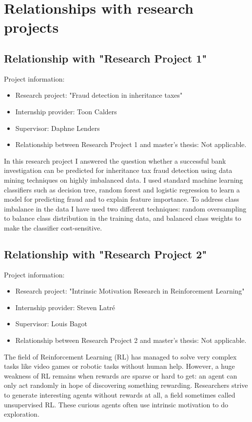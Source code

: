 \chapter{Relationships with research projects}

\section{Relationship with "Research Project 1"}
Project information:
\begin{itemize}
    \item Research project: "Fraud detection in inheritance taxes"
    \item Internship provider: Toon Calders
    \item Supervisor: Daphne Lenders
    \item Relationship between Research Project 1 and master's thesis: Not applicable.    
\end{itemize}

In this research project I answered the question whether a successful bank investigation can be predicted for inheritance tax fraud detection using data mining techniques on highly imbalanced data. I used standard machine learning classifiers such as decision tree, random forest and logistic regression to learn a model for predicting fraud and to explain feature importance. To address class imbalance in the data I have used two different techniques: random oversampling to balance class distribution in the training data, and balanced class weights to make the classifier cost-sensitive.

\section{Relationship with "Research Project 2"}
Project information:
\begin{itemize}
    \item Research project: "Intrinsic Motivation Research in Reinforcement Learning"
    \item Internship provider: Steven Latré
    \item Supervisor: Louis Bagot
    \item Relationship between Research Project 2 and master's thesis: Not applicable.
\end{itemize}

The field of Reinforcement Learning (RL) has managed to solve very complex tasks like video games or robotic tasks without human help. However, a huge weakness of RL remains when rewards are sparse or hard to get: an agent can only act randomly in hope of discovering something rewarding. Researchers strive to generate interesting agents without rewards at all, a field sometimes called unsupervised RL. These curious agents often use intrinsic motivation to do exploration. 

